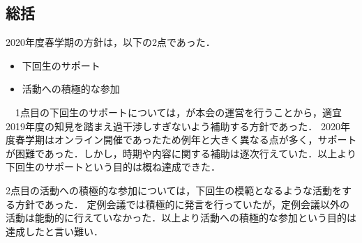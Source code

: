 \subsection*{\thirdGrade{}総括}


2020年度春学期の\thirdGrade{}方針は，以下の2点であった．
\begin{itemize}
  \item 下回生のサポート
  \item 活動への積極的な参加
\end{itemize}
　1点目の下回生のサポートについては，\secondGrade{}が本会の運営を行うことから，適宜2019年度の知見を踏まえ過干渉しすぎないよう補助する方針であった．
2020年度春学期はオンライン開催であったため例年と大きく異なる点が多く，サポートが困難であった．しかし，時期や内容に関する補助は逐次行えていた．以上より下回生のサポートという目的は概ね達成できた．

2点目の活動への積極的な参加については，下回生の模範となるような活動をする方針であった．
定例会議では積極的に発言を行っていたが，定例会議以外の活動は能動的に行えていなかった．以上より活動への積極的な参加という目的は達成したと言い難い．
